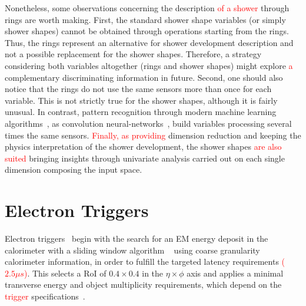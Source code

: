 Nonetheless, some observations concerning the description \textcolor{red}{of a shower} through rings are
worth making. First, the standard shower shape variables (or simply shower shapes) cannot be obtained through operations starting from the rings.  Thus, the rings represent an alternative for shower development description and not a possible replacement for the shower shapes.  Therefore, a strategy considering both variables altogether (rings and shower shapes) might explore \textcolor{red}{a} complementary discriminating information in future.
Second, one should also notice
that the rings do not use the same sensors more than once for each variable.
This is not strictly true for the shower shapes, although it is fairly unusual.
In contrast, pattern recognition through modern machine learning
algorithms~\cite{Engelbrecht2007,Goodfellow2016}, as convolution
neural-networks~\cite{Gu2018}, build variables processing several times
the same sensors. \textcolor{red}{Finally, as providing} dimension reduction and keeping the
physics interpretation of the shower development, the shower shapes \textcolor{red}{are also suited} bringing insights through univariate analysis carried out on each
single dimension composing the input space.



\section{Electron Triggers}\label{ssec:egamma_trigger}


Electron triggers~\cite{aad2020performance} begin with
the search for an EM energy deposit in the calorimeter with a \licalo{} sliding
window algorithm \textcolor{red}{~\cite{Franchino:2730851}} using coarse granularity calorimeter information, in order to
fulfill the targeted latency requirements \textcolor{red}{($2.5\mu s$)}. This selects a RoI of $0.4\times 0.4$
in the $\eta\times\phi$ axis and applies a minimal transverse energy and object
multiplicity requirements, which depend on the \textcolor{red}{trigger}
specifications~\cite{TRIG-2016-01}.
 

